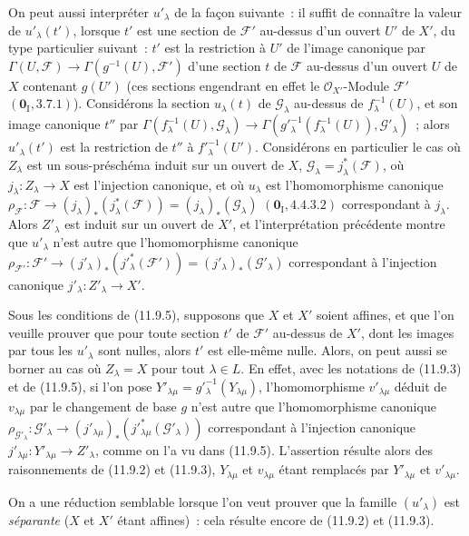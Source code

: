 \begin{env}[11.9.5]
On peut aussi interpréter $u'_\lambda$ de la façon suivante~: il suffit de
connaître la valeur de $u'_\lambda(t')$, lorsque $t'$ est une section de
$\mathcal F'$ au-dessus d'un ouvert $U'$ de $X'$, du type particulier
suivant~: $t'$ est la restriction à $U'$ de l'image canonique par
$\Gamma(U,\mathcal F)\to\Gamma(g^{-1}(U),\mathcal F')$ d'une section $t$ de
$\mathcal F$ au-dessus d'un ouvert $U$ de $X$ contenant $g(U')$ (ces sections
engendrant en effet le $\mathcal O_{X'}$-Module $\mathcal F'$
$(\mathbf 0_{\mathrm I},3.7.1)$). Considérons la section $u_\lambda(t)$ de
$\mathcal G_\lambda$ au-dessus de $f_\lambda^{-1}(U)$, et son image canonique
$t''$ par
$\Gamma(f_\lambda^{-1}(U),\mathcal G_\lambda)\to
\Gamma(g'^{-1}_\lambda(f_\lambda^{-1}(U)),\mathcal G'_\lambda)$~; alors
$u'_\lambda(t')$ est la restriction de $t''$ à $f'^{-1}_\lambda(U')$.
Considérons en particulier le cas où $Z_\lambda$ est un sous-préschéma induit
sur un ouvert de $X$, $\mathcal G_\lambda=j_\lambda^*(\mathcal F)$, où
$j_\lambda:Z_\lambda\to X$ est l'injection canonique, et où $u_\lambda$ est
l'homomorphisme canonique
$\rho_{\mathcal F}:\mathcal F\to(j_\lambda)_*(j_\lambda^*(\mathcal F))
=(j_\lambda)_*(\mathcal G_\lambda)$ $(\mathbf 0_{\mathrm I},4.4.3.2)$
correspondant à $j_\lambda$. Alors $Z'_\lambda$ est induit sur un ouvert de
$X'$, et l'interprétation précédente montre que $u'_\lambda$ n'est autre que
l'homomorphisme canonique
$\rho_{\mathcal F'}:\mathcal F'\to
(j'_\lambda)_*(j'^*_\lambda(\mathcal F'))
=(j'_\lambda)_*(\mathcal G'_\lambda)$ correspondant à l'injection canonique
$j'_\lambda:Z'_\lambda\to X'$.
\end{env}

\begin{env}[11.9.6]
\label{IV.11.9.6-fr}
Sous les conditions de (11.9.5), supposons que $X$ et $X'$ soient affines, et
que l'on veuille prouver que pour toute section $t'$ de $\mathcal F'$ au-dessus
de $X'$, dont les images par tous les $u'_\lambda$ sont nulles, alors $t'$ est
elle-même nulle. Alors, on peut aussi se borner au cas où $Z_\lambda=X$ pour
tout $\lambda\in L$. En effet, avec les notations de (11.9.3) et de (11.9.5),
si l'on pose $Y'_{\lambda\mu}=g'^{-1}_\lambda(Y_{\lambda\mu})$,
l'homomorphisme $v'_{\lambda\mu}$ déduit de $v_{\lambda\mu}$ par le changement
de base $g$ n'est autre que l'homomorphisme canonique
$\rho_{\mathcal G'_\lambda}:\mathcal G'_\lambda\to
(j'_{\lambda\mu})_*(j'^*_{\lambda\mu}(\mathcal G'_\lambda))$
correspondant à l'injection canonique
$j'_{\lambda\mu}:Y'_{\lambda\mu}\to Z'_\lambda$, comme on l'a vu dans
(11.9.5). L'assertion résulte alors des raisonnements de (11.9.2) et (11.9.3),
$Y_{\lambda\mu}$ et $v_{\lambda\mu}$ étant remplacés par
$Y'_{\lambda\mu}$ et $v'_{\lambda\mu}$.

On a une réduction semblable lorsque l'on veut prouver que la famille
$(u'_\lambda)$ est \emph{séparante} ($X$ et $X'$ étant affines)~: cela résulte
encore de (11.9.2) et (11.9.3).
\end{env}

